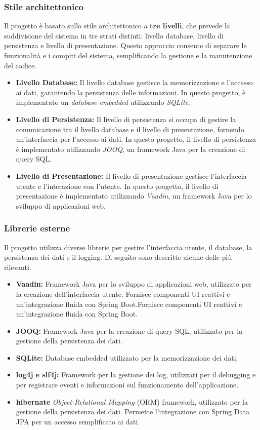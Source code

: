 \documentclass[a4paper,12pt]{article}
\begin{document}
\subsubsection{Stile architettonico}
Il progetto è basato sullo stile architettonico a \textbf{tre livelli}, che prevede la suddivisione del sistema in tre strati distinti: livello database, livello di persistenza e livello di presentazione. Questo approccio consente di separare le funzionalità e i compiti del sistema, semplificando la gestione e la manutenzione del codice.
\begin{itemize}
    \item \textbf{Livello Database:} 
    Il livello database gestisce la memorizzazione e l'accesso ai dati, garantendo la persistenza delle informazioni. In questo progetto, è implementato un \textit{database embedded} utilizzando \textit{SQLite}.
    \item \textbf{Livello di Persistenza:} 
    Il livello di persistenza si occupa di gestire la comunicazione tra il livello database e il livello di presentazione, fornendo un'interfaccia per l'accesso ai dati. In questo progetto, il livello di persistenza è implementato utilizzando \textit{JOOQ}, un framework Java per la creazione di query SQL.   
    \item \textbf{Livello di Presentazione:} 
    Il livello di presentazione gestisce l'interfaccia utente e l'interazione con l'utente. In questo progetto, il livello di presentazione è implementato utilizzando \textit{Vaadin}, un framework Java per lo sviluppo di applicazioni web.
\end{itemize}
\subsubsection{Librerie esterne}
Il progetto utilizza diverse librerie per gestire l’interfaccia utente, il database, la persistenza dei dati e il logging. Di seguito sono descritte alcune delle più rilevanti.
\begin{itemize}
    \item \textbf{Vaadin:} Framework Java per lo sviluppo di applicazioni web, utilizzato per la creazione dell'interfaccia utente. Fornisce componenti UI reattivi e un’integrazione fluida con Spring Boot.Fornisce componenti UI reattivi e un’integrazione fluida con Spring Boot.
    \item \textbf{JOOQ:} Framework Java per la creazione di query SQL, utilizzato per la gestione della persistenza dei dati.
    \item \textbf{SQLite:} Database embedded utilizzato per la memorizzazione dei dati.
    \item \textbf{log4j e slf4j:} Framework per la gestione dei log, utilizzati per il debugging e per registrare eventi e informazioni sul funzionamento dell'applicazione.
    \item \textbf{hibernate} \textit{Object-Relational Mapping} (ORM) framework, utilizzato per la gestione della persistenza dei dati. Permette l'integrazione con Spring Data JPA per un accesso semplificato ai dati.
\end{itemize}
\end{document}
